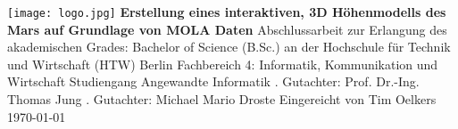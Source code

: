 \begin{titlepage}
\begin{center}
\texttt{[image: logo.jpg]}
\linebreak[4]
\linebreak[4]
\linebreak[4]
\linebreak[4]
\textbf{\Large\color{htwgreen}Erstellung eines interaktiven, 3D Höhenmodells des Mars auf Grundlage von MOLA Daten}
\linebreak[4]
\linebreak[4]
\linebreak[4]
Abschlussarbeit
\linebreak[4]
\linebreak[4]
zur Erlangung des akademischen Grades:
\linebreak[4]
\linebreak[4]
Bachelor of Science (B.Sc.)
\linebreak[4]
\linebreak[4]
an der
\linebreak[4]
\linebreak[4]
Hochschule für Technik und Wirtschaft (HTW) Berlin
\linebreak[4]
Fachbereich 4: Informatik, Kommunikation und Wirtschaft
\linebreak[4]
Studiengang Angewandte Informatik
\linebreak[4]
\linebreak[4]
. Gutachter: Prof. Dr.-Ing. Thomas Jung
. Gutachter: Michael Mario Droste
\linebreak[4]
\linebreak[4]
\linebreak[4]
\linebreak[4]
\linebreak[4]
Eingereicht von Tim Oelkers
\vfill
\today
\end{center}
\end{titlepage}